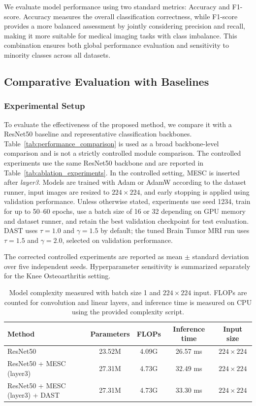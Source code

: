 \documentclass[runningheads]{llncs}
\begin{document}
We evaluate model performance using two standard metrics: Accuracy and F1-score. Accuracy measures the overall classification correctness, while F1-score provides a more balanced assessment by jointly considering precision and recall, making it more suitable for medical imaging tasks with class imbalance. This combination ensures both global performance evaluation and sensitivity to minority classes across all datasets.

\subsection{Comparative Evaluation with Baselines}
\subsubsection{Experimental Setup}
To evaluate the effectiveness of the proposed method, we compare it with a ResNet50 baseline and representative classification backbones. Table~\ref{tab:performance_comparison} is used as a broad backbone-level comparison and is not a strictly controlled module comparison. The controlled experiments use the same ResNet50 backbone and are reported in Table~\ref{tab:ablation_experiments}. In the controlled setting, MESC is inserted after \textit{layer3}. Models are trained with Adam or AdamW according to the dataset runner, input images are resized to \(224 \times 224\), and early stopping is applied using validation performance. Unless otherwise stated, experiments use seed 1234, train for up to 50--60 epochs, use a batch size of 16 or 32 depending on GPU memory and dataset runner, and retain the best validation checkpoint for test evaluation. DAST uses \(\tau=1.0\) and \(\gamma=1.5\) by default; the tuned Brain Tumor MRI run uses \(\tau=1.5\) and \(\gamma=2.0\), selected on validation performance.

The corrected controlled experiments are reported as mean \(\pm\) standard deviation over five independent seeds. Hyperparameter sensitivity is summarized separately for the Knee Osteoarthritis setting.

\begin{table}[H]
    \centering
    \caption{Model complexity measured with batch size 1 and \(224 \times 224\) input. FLOPs are counted for convolution and linear layers, and inference time is measured on CPU using the provided complexity script.}
    \label{tab:model_complexity}
    \scriptsize
    \begin{tabular}{lcccc}
        \toprule
        Method & Parameters & FLOPs & Inference time & Input size \\
        \midrule
        ResNet50 & 23.52M & 4.09G & 26.57 ms & \(224 \times 224\) \\
        ResNet50 + MESC (layer3) & 27.31M & 4.73G & 32.49 ms & \(224 \times 224\) \\
        ResNet50 + MESC (layer3) + DAST & 27.31M & 4.73G & 33.30 ms & \(224 \times 224\) \\
        \bottomrule
    \end{tabular}
\end{table}
\end{document}
